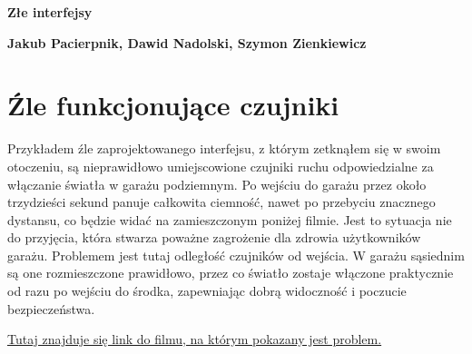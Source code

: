 \documentclass[12pt]{article}
\begin{document}
 \begin{titlepage}
 \begin{center}
        \vspace*{1cm}
 
        \Huge
        \textbf{Złe interfejsy}
 
        \vspace{0.5cm}
        \LARGE
       
 
        \vspace{1.5cm}
 
        \textbf{Jakub Pacierpnik, Dawid Nadolski, Szymon Zienkiewicz}
 
        \vfill
    \end{center}
 \end{titlepage}
 \section{Źle funkcjonujące czujniki}
Przykładem źle zaprojektowanego interfejsu, z którym zetknąłem się w swoim otoczeniu, są nieprawidłowo umiejscowione czujniki ruchu odpowiedzialne za włączanie światła w garażu podziemnym. Po wejściu do garażu przez około trzydzieści sekund panuje całkowita ciemność, nawet po przebyciu znacznego dystansu, co będzie widać na zamieszczonym poniżej filmie. Jest to sytuacja nie do przyjęcia, która stwarza poważne zagrożenie dla zdrowia użytkowników garażu. Problemem jest tutaj odległość czujników od wejścia. W garażu sąsiednim są one rozmieszczone prawidłowo, przez co światło zostaje włączone praktycznie od razu po wejściu do środka, zapewniając dobrą widoczność i poczucie bezpieczeństwa.
 \newline
 \begin{center}
 \href{https://drive.google.com/open?id=1VdbMeJAAv0NQNLKfLPST7r1uHFxxe-jP}{Tutaj znajduje się link do filmu, na którym pokazany jest problem.}
 \end{center}
\end{document}
